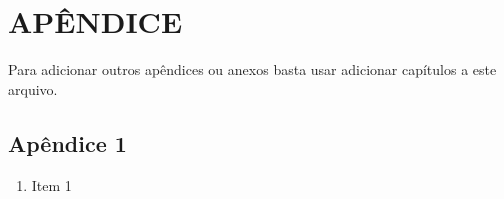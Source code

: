 \chapter{APÊNDICE}
\label{cap:apendice}
Para adicionar outros apêndices ou anexos basta usar adicionar capítulos a este arquivo. 
\section{Apêndice 1}
\begin{enumerate}
    \item Item 1
\end{enumerate}
